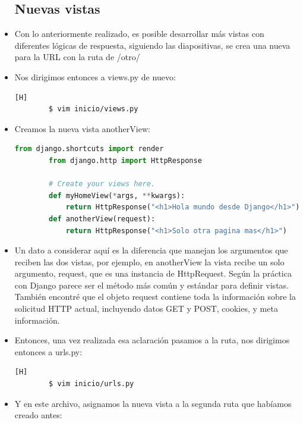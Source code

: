 \documentclass{article}
\begin{document}
\begin{itemize}
        \subsection{Nuevas vistas}
            \item Con lo anteriormente realizado, es posible desarrollar más vistas con diferentes lógicas de respuesta, siguiendo las diapositivas, se crea una nueva para la URL con la ruta de /otro/
            \item Nos dirigimos entonces a views.py de nuevo:

        \begin{lstlisting}[language=bash,caption={Ingresando a views.py}][H]
        $ vim inicio/views.py
        \end{lstlisting}

            \item Creamos la nueva vista anotherView:
        
        \begin{lstlisting}[language=Python, caption={Creación de la nueva vista anotherView}]
        from django.shortcuts import render
        from django.http import HttpResponse
        
        # Create your views here.
        def myHomeView(*args, **kwargs):
            return HttpResponse("<h1>Hola mundo desde Django</h1>")
        def anotherView(request):
            return HttpResponse("<h1>Solo otra pagina mas</h1>")
        \end{lstlisting}

            \item Un dato a considerar aquí es la diferencia que manejan los argumentos que reciben las dos vistas, por ejemplo, en anotherView la vista recibe un solo argumento, request, que es una instancia de HttpRequest. Según la práctica con Django parece ser el método más común y estándar para definir vistas. También encontré que el objeto request contiene toda la información sobre la solicitud HTTP actual, incluyendo datos GET y POST, cookies, y meta información.
            \item Entonces, una vez realizada esa aclaración pasamos a la ruta, nos dirigimos entonces a urls.py:

        \begin{lstlisting}[language=bash,caption={Ingresando a urls.py}][H]
        $ vim inicio/urls.py
        \end{lstlisting}
            \item Y en este archivo, asignamos la nueva vista a la segunda ruta que habíamos creado antes:
        

\end{itemize}
\end{document}
